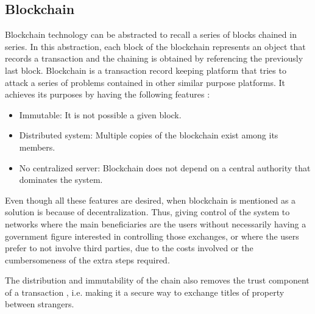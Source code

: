 \subsection{Blockchain}

Blockchain technology can be abstracted to recall a series of blocks chained in series. In this abstraction, each block of the blockchain represents an object that records a transaction and the chaining is obtained by referencing the previously last block. Blockchain is a transaction record keeping platform that tries to attack a series of problems contained in other similar purpose platforms. It achieves its purposes by having the following features \cite{block}:

\begin{itemize}
\item Immutable: It is not possible a given block.
\item Distributed system: Multiple copies of the blockchain exist among its members.
\item No centralized server: Blockchain does not depend on a central authority that dominates the system.            
\end{itemize}
Even though all these features are desired, when blockchain is mentioned as a solution is because of decentralization. Thus, giving control of the system to networks where the main beneficiaries are the users without necessarily having a government figure interested in controlling those exchanges, or where the users prefer to not involve third parties, due to the costs involved or the cumbersomeness of the extra steps required. 

The distribution and immutability of the chain also removes the trust component of a transaction \cite{iot}, i.e. making it a secure way to exchange titles of property between strangers.
